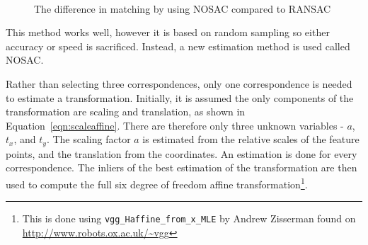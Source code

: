 \documentclass[11pt, onecolumn, a4paper, final]{report} %
\begin{document}
\begin{figure}[htb]
\centering 
{}
\\
\caption{The difference in matching by using NOSAC compared to RANSAC}
\label{fig:ransacnosac}
\end{figure}

This method works well, however it is based on random sampling so either accuracy or speed is sacrificed. Instead, a new estimation method is used called NOSAC. 

Rather than selecting three correspondences, only one correspondence is needed to estimate a transformation. Initially, it is assumed the only components of the transformation are scaling and translation, as shown in Equation~\ref{eqn:scaleaffine}. There are therefore only three unknown variables - $a$, $t_x$, and $t_y$. The scaling factor $a$ is estimated from the relative scales of the feature points, and the translation from the coordinates. An estimation is done for every correspondence. The inliers of the best estimation of the transformation are then used to compute the full six degree of freedom affine transformation\footnote{This is done using \lstinline$vgg_Haffine_from_x_MLE$ by Andrew Zisserman found on \url{http://www.robots.ox.ac.uk/~vgg}}. 
\end{document}
